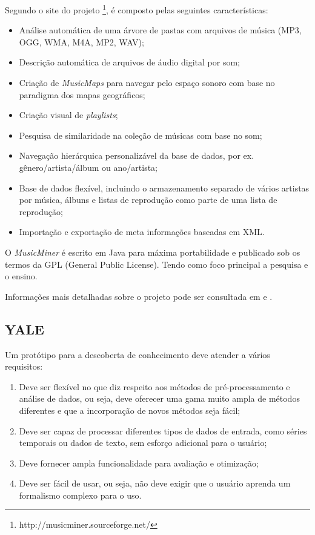 Segundo o site do projeto \footnote{http://musicminer.sourceforge.net/}, é composto pelas seguintes características:

\begin{itemize}
    \item Análise automática de uma árvore de pastas com arquivos de música (MP3, OGG, WMA, M4A, MP2, WAV);
    \item Descrição automática de arquivos de áudio digital por som;
    \item Criação de \textit{MusicMaps} para navegar pelo espaço sonoro com base no paradigma dos mapas geográficos;
    \item Criação visual de \textit{playlists};
    \item Pesquisa de similaridade na coleção de músicas com base no som;
    \item Navegação hierárquica personalizável da base de dados, por ex. gênero/artista/álbum ou ano/artista;
    \item Base de dados flexível, incluindo o armazenamento separado de vários artistas por música, álbuns e listas de reprodução como parte de uma lista de reprodução;
    \item Importação e exportação de meta informações baseadas em XML.
\end{itemize}

O \textit{MusicMiner} é escrito em Java para máxima portabilidade e publicado sob os termos da GPL (General Public License). Tendo como foco principal a pesquisa e o ensino.

Informações mais detalhadas sobre o projeto pode ser consultada em \cite{morchen2005} e \cite{musicminer}.

\subsection{YALE}
Um protótipo para a descoberta de conhecimento deve atender a vários requisitos:

\begin{enumerate}
    \item Deve ser flexível no que diz respeito aos métodos de pré-processamento e análise de dados, ou seja, deve oferecer uma gama muito ampla de métodos diferentes e que a incorporação de novos métodos seja fácil;
    \item Deve ser capaz de processar diferentes tipos de dados de entrada, como séries temporais ou dados de texto, sem esforço adicional para o usuário;
    \item Deve fornecer ampla funcionalidade para avaliação e otimização;
    \item Deve ser fácil de usar, ou seja, não deve exigir que o usuário aprenda um formalismo complexo para o uso.
    
\end{enumerate}

